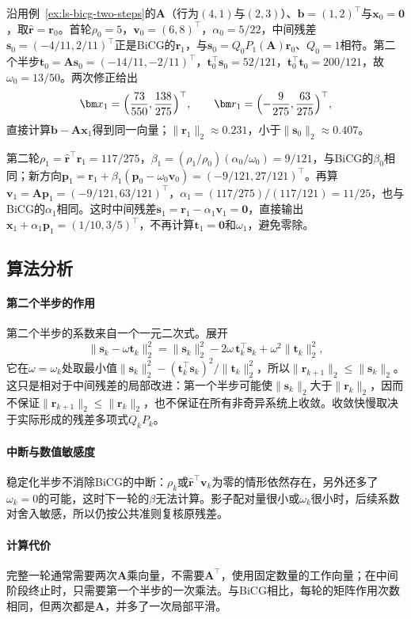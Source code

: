 \begin{example}[非对称二阶系统上的BiCGSTAB]
\label{ex:ls-bicgstab-nonsymmetric}
沿用例~\ref{ex:ls-bicg-two-steps}的$\bm A$（行为$(4,1)$与$(2,3)$）、$\bm b=(1,2)^\top$与$\bm x_0=\bm0$，取$\widehat{\bm r}=\bm r_0$。首轮$\rho_0=5$，$\bm v_0=(6,8)^\top$，$\alpha_0=5/22$，中间残差$\bm s_0=(-4/11,2/11)^\top$正是BiCG的$\bm r_1$，与$\bm s_0=Q_0P_1(\bm A)\bm r_0$、$Q_0=1$相符。第二个半步$\bm t_0=\bm A\bm s_0=(-14/11,-2/11)^\top$，$\bm t_0^\top\bm s_0=52/121$，$\bm t_0^\top\bm t_0=200/121$，故$\omega_0=13/50$。两次修正给出
\[
 \bm x_1=\Bigl(\frac{73}{550},\frac{138}{275}\Bigr)^\top,\qquad
 \bm r_1=\Bigl(-\frac9{275},\frac{63}{275}\Bigr)^\top ,
\]
直接计算$\bm b-\bm A\bm x_1$得到同一向量；$\lVert\bm r_1\rVert_2\approx0.231$，小于$\lVert\bm s_0\rVert_2\approx0.407$。

第二轮$\rho_1=\widehat{\bm r}^\top\bm r_1=117/275$，$\beta_1=(\rho_1/\rho_0)(\alpha_0/\omega_0)=9/121$，与BiCG的$\beta_0$相同；新方向$\bm p_1=\bm r_1+\beta_1(\bm p_0-\omega_0\bm v_0)=(-9/121,27/121)^\top$。再算$\bm v_1=\bm A\bm p_1=(-9/121,63/121)^\top$，$\alpha_1=(117/275)/(117/121)=11/25$，也与BiCG的$\alpha_1$相同。这时中间残差$\bm s_1=\bm r_1-\alpha_1\bm v_1=\bm0$，直接输出$\bm x_1+\alpha_1\bm p_1=(1/10,3/5)^\top$，不再计算$\bm t_1=\bm0$和$\omega_1$，避免零除。
\end{example}

\subsection{算法分析}

\paragraph{第二个半步的作用}
第二个半步的系数来自一个一元二次式。展开
\[
 \lVert\bm s_k-\omega\bm t_k\rVert_2^2=\lVert\bm s_k\rVert_2^2-2\omega\,\bm t_k^\top\bm s_k+\omega^2\lVert\bm t_k\rVert_2^2,
\]
它在$\omega=\omega_k$处取最小值$\lVert\bm s_k\rVert_2^2-(\bm t_k^\top\bm s_k)^2/\lVert\bm t_k\rVert_2^2$，所以$\lVert\bm r_{k+1}\rVert_2\le\lVert\bm s_k\rVert_2$。这只是相对于中间残差的局部改进：第一个半步可能使$\lVert\bm s_k\rVert_2$大于$\lVert\bm r_k\rVert_2$，因而不保证$\lVert\bm r_{k+1}\rVert_2\le\lVert\bm r_k\rVert_2$，也不保证在所有非奇异系统上收敛。收敛快慢取决于实际形成的残差多项式$Q_kP_k$。

\paragraph{中断与数值敏感度}
稳定化半步不消除BiCG的中断：$\rho_k$或$\widehat{\bm r}^\top\bm v_k$为零的情形依然存在，另外还多了$\omega_k=0$的可能，这时下一轮的$\beta$无法计算。影子配对量很小或$\omega_k$很小时，后续系数对舍入敏感，所以仍按公共准则复核原残差。

\paragraph{计算代价}
完整一轮通常需要两次$\bm A$乘向量，不需要$\bm A^\top$，使用固定数量的工作向量；在中间阶段终止时，只需要第一个半步的一次乘法。与BiCG相比，每轮的矩阵作用次数相同，但两次都是$\bm A$，并多了一次局部平滑。
